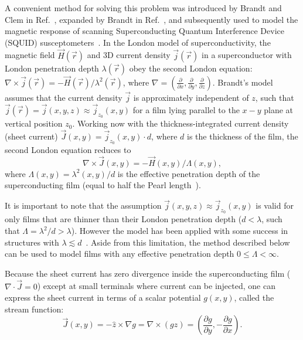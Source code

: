 \documentclass[final,3p,times,twocolumn]{elsarticle}
\newcounter{bla}
\begin{document}
A convenient method for solving this problem was introduced by Brandt and Clem in Ref.~\cite{Brandt2004-ew}, expanded by Brandt in Ref.~\cite{Brandt2005-wj}, and subsequently used to model the magnetic response of scanning Superconducting Quantum Interference Device (SQUID) susceptometers~\cite{Kirtley2016-zz, Kirtley2016-gt}. In the London model of superconductivity, the magnetic field $\vec{H}(\vec{r})$ and 3D current density $\vec{j}(\vec{r})$ in a superconductor with London penetration depth $\lambda(\vec{r})$ obey the second London equation:
$\nabla\times\vec{j}(\vec{r})=-\vec{H}(\vec{r})/\lambda^2(\vec{r})$, where
$\nabla=\left(\frac{\partial}{\partial x}, \frac{\partial}{\partial y}, \frac{\partial}{\partial z}\right)$. Brandt's model assumes that the current density $\vec{j}$ is approximately independent of $z$, such that  $\vec{j}(\vec{r}) = \vec{j}(x, y, z)\approx\vec{j}_{z_0}(x, y)$ for a film lying parallel to the $x-y$ plane at vertical position $z_0$. Working now with the thickness-integrated current density (sheet current) $\vec{J}(x, y)=\vec{j}_{z_0}(x, y)\cdot d$, where $d$
is the thickness of the film, the second London equation reduces to
\begin{equation}
    \label{eq:london}
    \nabla\times\vec{J}(x, y)=-\vec{H}(x, y)/\Lambda(x, y),
\end{equation}
where $\Lambda(x, y)=\lambda^2(x, y)/d$ is the effective penetration depth
of the superconducting film (equal to half the Pearl length~\cite{Pearl1964-cl}).

It is important to note that the assumption $\vec{j}(x, y, z)\approx\vec{j}_{z_0}(x, y)$ is valid for only films that are thinner than their London penetration depth ($d<\lambda$, such that $\Lambda=\lambda^2/d>\lambda$). However the model has been applied with some success in structures with $\lambda\lesssim d$~\cite{Kirtley2016-zz,Kirtley2016-gt}. Aside from this limitation, the method described below can be used to model films with any effective penetration depth $0\leq\Lambda<\infty$.

Because the sheet current has zero divergence inside the superconducting film ($\nabla\cdot\vec{J}=0$)
except at small terminals where current can be injected, one can express the sheet current in terms
of a scalar potential $g(x, y)$, called the stream function:
\begin{equation}
    \label{eq:stream}
    \vec{J}(x, y) = -\hat{z}\times\nabla g
    = \nabla\times(g\hat{z})
    = \left(\frac{\partial g}{\partial y}, -\frac{\partial g}{\partial x}\right).
\end{equation}
\end{document}
